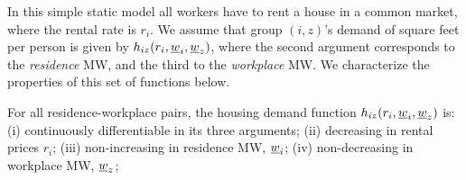 In this simple static model all workers have to rent a house in a common market, 
where the rental rate is $r_i$.
We assume that group $(i,z)$'s demand of square feet per person is given by $h_{iz}
(r_i, \underline{w}_i, \underline{w}_z)$, where the second argument corresponds to the \textit{residence} 
MW, and the third to the \textit{workplace} MW.
We characterize the properties of this set of functions below.

\begin{assu}\label{assu:housing_function}
	For all residence-workplace pairs, the housing demand function $h_{iz} (r_i, 	
	\underline{w}_i, \underline{w}_z)$ is:
	(i) continuously differentiable in its three arguments;
	(ii) decreasing in rental prices $r_i$;
	(iii) non-increasing in residence MW, $\underline{w}_i$;
	(iv) non-decreasing in workplace MW, $\underline{w}_z$;
\end{assu}

